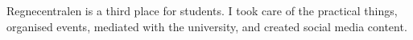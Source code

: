 
Regnecentralen is a third place for students. I took care of the practical things, organised events,
mediated with the university, and created social media content.
